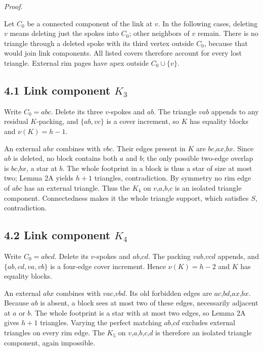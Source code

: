 \documentclass[11pt]{article}
\begin{document}
\emph{Proof.}

Let \(C_0\) be a connected component of the link at \(v\). In the
following cases, deleting \(v\) means deleting just the spokes into
\(C_0\); other neighbors of \(v\) remain. There is no triangle through a
deleted spoke with its third vertex outside \(C_0\), because that would
join link components. All listed covers therefore account for every lost
triangle. External rim pages have apex outside \(C_0\cup \{v\}\).

\subsection{\texorpdfstring{4.1 Link component
\(K_3\)}{4.1 Link component K\_3}}\label{link-component-k_3}

Write \(C_0=abc\). Delete its three \(v\)-spokes and \(ab\). The
triangle \(vab\) appends to any residual \(K\)-packing, and
\(\{ab,vc\}\) is a cover increment, so \(K\) has equality blocks and
\(\nu(K)=h-1\).

An external \(abx\) combines with \(vbc\). Their edges present in \(K\)
are \(bc\),\(ax\),\(bx\). Since \(ab\) is deleted, no block contains
both \(a\) and \(b\); the only possible two-edge overlap is
\(bc\),\(bx\), a star at \(b\). The whole footprint in a block is thus a
star of size at most two; Lemma 2A yields \(h+1\) triangles,
contradiction. By symmetry no rim edge of \(abc\) has an external
triangle. Thus the \(K_4\) on \(v\),\(a\),\(b\),\(c\) is an isolated
triangle component. Connectedness makes it the whole triangle support,
which satisfies \(S\), contradiction.

\subsection{\texorpdfstring{4.2 Link component
\(K_4\)}{4.2 Link component K\_4}}\label{link-component-k_4}

Write \(C_0=abcd\). Delete its \(v\)-spokes and \(ab\),\(cd\). The
packing \(vab\),\(vcd\) appends, and \(\{ab,cd,va,vb\}\) is a four-edge
cover increment. Hence \(\nu(K)=h-2\) and \(K\) has equality blocks.

An external \(abx\) combines with \(vac\),\(vbd\). Its old forbidden
edges are \(ac\),\(bd\),\(ax\),\(bx\). Because \(ab\) is absent, a block
sees at most two of these edges, necessarily adjacent at \(a\) or \(b\).
The whole footprint is a star with at most two edges, so Lemma 2A gives
\(h+1\) triangles. Varying the perfect matching \(ab\),\(cd\) excludes
external triangles on every rim edge. The \(K_5\) on
\(v\),\(a\),\(b\),\(c\),\(d\) is therefore an isolated triangle
component, again impossible.
\end{document}
